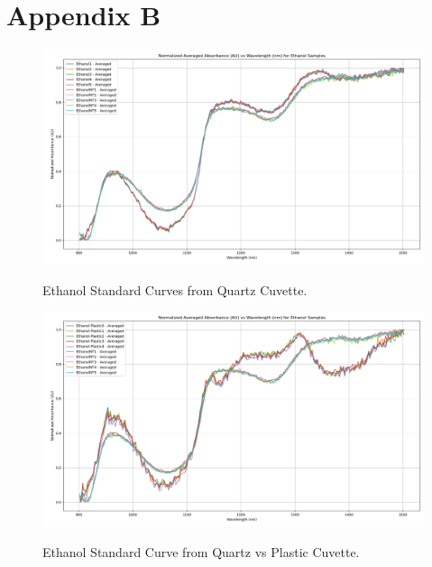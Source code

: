 \documentclass[final, 3p, 11pt]{elsarticle}
\begin{document}
\newpage
\section*{Appendix B}

\renewcommand{\thefigure}{B.\arabic{figure}}
\setcounter{figure}{0}  %

\begin{figure}[H]
    \captionsetup{justification=raggedright, singlelinecheck=false, position=above}  %
    \caption{Ethanol Standard Curves from Quartz Cuvette.}
    \centering
    \includegraphics[width=\textwidth]{Images/Ethanol_Standard_Compared.png}
    \label{fig:appendix_ethanol_standard}
\end{figure}

\newpage
\begin{figure}[h]
  \captionsetup{justification=raggedright, singlelinecheck=false, position=above}  %
  \caption{Ethanol Standard Curve from Quartz vs Plastic Cuvette.}
  \centering
  \includegraphics[width=\textwidth]{Images/Ethanol_Standard_PvQ.png}  %
  \label{fig:appendix_ethanol_plastic}
\end{figure}
\end{document}
